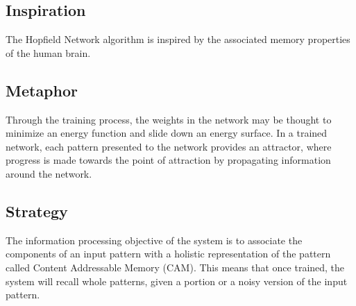 \subsection{Inspiration}
The Hopfield Network algorithm is inspired by the associated memory properties of the human brain.

\subsection{Metaphor}
Through the training process, the weights in the network may be thought to minimize an energy function and slide down an energy surface. In a trained network, each pattern presented to the network provides an attractor, where progress is made towards the point of attraction by propagating information around the network.

\subsection{Strategy}
The information processing objective of the system is to associate the components of an input pattern with a holistic representation of the pattern called Content Addressable Memory (CAM). This means that once trained, the system will recall whole patterns, given a portion or a noisy version of the input pattern.

